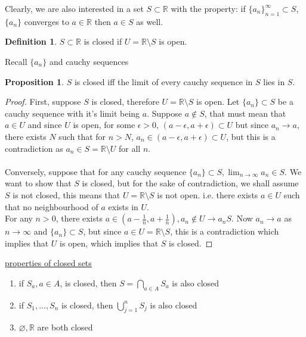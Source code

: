 \documentclass[12pt]{article}
\theoremstyle{plain}
\theoremstyle{definition}
\newtheorem{definition}[theorem]{Definition}
\newtheorem{proposition}[theorem]{Proposition}
\begin{document}
Clearly, we are also interested in a set $S\subset\mathbb{R}$ with the property: if $\{ a_n \}^\infty_{n=1} \subset S$, $\{ a_n \}$ converges to $a \in\mathbb{R}$ then $a \in S$ as well.

\begin{definition}
	$S\subset\mathbb{R}$ is closed if $U=\mathbb{R}\setminus S$ is open.
\end{definition}

Recall $\{ a_n \}$ and cauchy sequences

\begin{proposition}
	$S$ is closed iff the limit of every cauchy sequence in $S$ lies in $S$.
\end{proposition}

\begin{proof}
	First, suppose $S$ is closed, therefore $U = \mathbb{R}\setminus S$ is open. Let $\{ a_n \}\subset S$ be a cauchy sequence with it's limit being $a$. Suppose $a\not\in S$, that must mean that $a \in U$ and since $U$ is open, for some $\epsilon > 0$, $(a-\epsilon, a+\epsilon) \subset U$ but since $a_n \to a$, there exists $N$ such that for $n > N$, $a_n \in (a-\epsilon, a+\epsilon) \subset U$, but this is a contradiction as $a_n \in S = \mathbb{R} \setminus U$ for all $n$.\\
	\\
	Conversely, suppose that for any cauchy sequence $\{ a_n \} \subset S, \lim_{n\to\infty} a_n \in S.$ We want to show that $S$ is closed, but for the sake of contradiction, we shall assume $S$ is not closed, this means that $U=\mathbb{R} \setminus S$ is not open. i.e. there exists $a \in U$ such that no neighbourhood of $a$ exists in $U$.\\
	For any $n > 0$, there exists $a \in (a-\frac{1}{n} , a+\frac{1}{n}), a_n \not\in U \to a_n S$. Now $a_n \to a$ as $n \to \infty$ and $\{ a_n \}\subset S$, but since $a\in U = \mathbb{R} \setminus S$, this is a contradiction which implies that $U$ is open, which implies that $S$ is closed.
\end{proof}

\underline{properties of closed sets}
\begin{enumerate}
	\item{if $S_a, a\in A$, is closed, then $S = \bigcap_{a\in A} S_a$ is also closed}
	\item{if $S_1,...,S_n$ is closed, then $\bigcup^n_{j=1} S_j$ is also closed}
	\item{$\varnothing, \mathbb{R}$ are both closed}
\end{enumerate}
\end{document}
